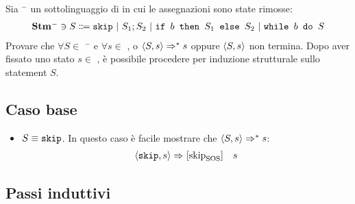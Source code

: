 \newcommand{\stmm}{\stm$^{-}$}

{Sia \stmm{} un sottolinguaggio di \stm{} in cui le assegnazioni sono state
rimosse:
\begin{align*}
\mbox{\stmm} \ni{} S \Coloneqq{}  \skipForFriends\ | \ 
                                  S_1; S_2\ | \ 
                                  \ifABC{b}{S_1}{S_2}\ | \ 
                                  \wbS{b}{S}
\end{align*}
Provare che $\forall{S} \in$ \stmm{} e $\forall{s} \in$ \states, o
$\langle{}S, s\rangle{} \Rightarrow^{*} s$ oppure $\langle{}S, s\rangle{}$ non termina.
}
{}
Dopo aver fissato uno stato $s \in$ \states, è possibile procedere per
induzione strutturale sullo statement $S$.

\subsection{Caso base}

\begin{itemize}
  \item $S \equiv{} \textrm{\normalfont{\texttt{skip}}}$. In questo caso è facile mostrare che
    $\langle{}S, s\rangle{} \Rightarrow^{*} s$:
\begin{align*}
\langle{}\textrm{\normalfont{\texttt{skip}}}, s\rangle{} \Rightarrow^{}  [ \textrm{\normalfont{skip}} ^ \textrm{\normalfont{}} _\textrm{\normalfont{SOS}} ]  \ \ \ s
\end{align*}
\end{itemize}

\subsection{Passi induttivi}


